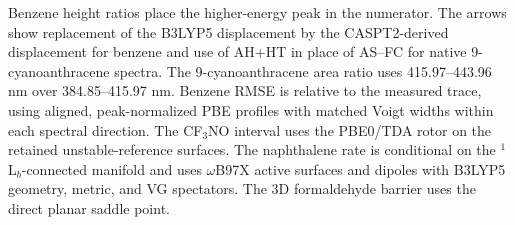 \begin{table}[htbp]
  \smallskip
  \parbox{\linewidth}{\footnotesize\raggedright
    Benzene height ratios place the higher-energy peak in the numerator.
    The arrows show replacement of the B3LYP5 displacement by the CASPT2-derived
    displacement for benzene and use of AH+HT in place of AS--FC for native 9-cyanoanthracene spectra.
    The 9-cyanoanthracene area ratio uses 415.97--443.96 nm over 384.85--415.97 nm.
    Benzene RMSE is relative to the measured trace, using aligned, peak-normalized PBE profiles
    with matched Voigt widths within each spectral direction.
    The CF$_3$NO interval uses the PBE0/TDA rotor on the retained unstable-reference surfaces.
    The naphthalene rate is conditional on the $^1$L$_b$-connected manifold and uses
    $\omega$B97X active surfaces and dipoles with B3LYP5 geometry, metric, and VG spectators.
    The 3D formaldehyde barrier uses the direct planar saddle point.}
\end{table}
